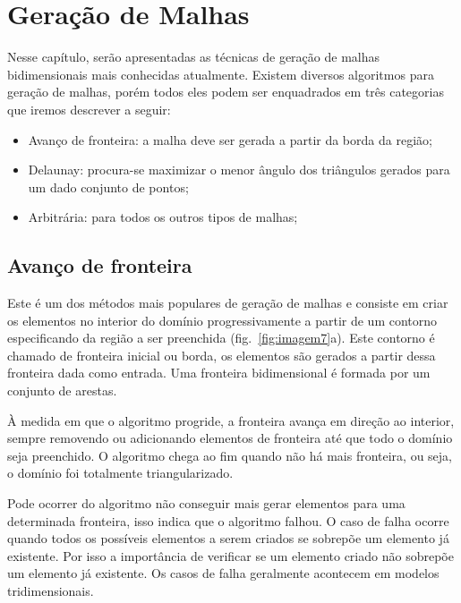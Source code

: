 \pagestyle{empty}
\cleardoublepage
\pagestyle{fancy}

\chapter{Geração de Malhas}\label{cap3}

Nesse capítulo, serão apresentadas as técnicas de geração de malhas bidimensionais mais conhecidas atualmente. Existem diversos algoritmos para geração de malhas, porém todos eles podem ser enquadrados em três categorias que iremos descrever a seguir:

\begin{itemize}
  \item Avanço de fronteira: a malha deve ser gerada a partir da borda da região;

  \item Delaunay: procura-se maximizar o menor ângulo dos triângulos gerados para um dado conjunto de pontos;

  \item Arbitrária: para todos os outros tipos de malhas;
\end{itemize}

\section{Avanço de fronteira}

Este é um dos métodos mais populares de geração de malhas e consiste em criar os elementos no interior do domínio progressivamente a partir de um contorno especificando da região a ser preenchida (fig.~\ref{fig:imagem7}a). Este contorno é chamado de fronteira inicial ou borda, os elementos são gerados a partir dessa fronteira dada como entrada. Uma fronteira bidimensional é formada por um conjunto de arestas.

À medida em que o algoritmo progride, a fronteira avança em direção ao interior, sempre removendo ou adicionando elementos de fronteira até que todo o domínio seja preenchido. O algoritmo chega ao fim quando não há mais fronteira, ou seja, o domínio foi totalmente triangularizado. 

Pode ocorrer do algoritmo não conseguir mais gerar elementos para uma determinada fronteira, isso indica que o algoritmo falhou. O caso de falha ocorre quando todos os possíveis elementos a serem criados se sobrepõe um elemento já existente. Por isso a importância de verificar se um elemento criado não sobrepõe um elemento já existente. Os casos de falha geralmente acontecem em modelos tridimensionais.

